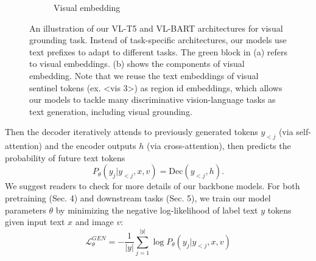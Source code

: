 \documentclass[twocolumn,3p,a4paper,preprint,11pt,margin=2.5cm]{elsarticle}
\begin{document}
\begin{figure}[tp]
\begin{subfigure}{0.45\textwidth}
        \caption{Visual embedding}
        \label{fig:embedding}
    \end{subfigure}
    \caption{An illustration of our VL-T5 and VL-BART architectures for visual grounding task. Instead of task-specific architectures, our
models use text prefixes to adapt to different tasks. The green block in (a) refers to visual embeddings. (b) shows the components of visual
embedding. Note that we reuse the text embeddings of visual sentinel tokens (ex. <vis 3>) as region id embeddings, which allows our
models to tackle many discriminative vision-language tasks as text generation, including visual grounding.}
    \label{fig:combined}
\end{figure}

Then the decoder iteratively attends to previously generated tokens $y_{<j}$ (via self-attention) and the encoder outputs $h$ (via cross-attention), then predicts the probability of future text tokens
$$ P_{\theta}(y_j | y_{<j}, x, v) = \text{Dec}(y_{<j}, h). $$
We suggest readers to check \cite{MingWeiChang} \cite{XinleiChen} for more details of our backbone models. For both pretraining (Sec. 4) and downstream tasks (Sec. 5), we train our model parameters $\theta$ by minimizing the negative log-likelihood of label text $y$ tokens given input text $x$ and image $v$:
\begin{equation}
     \mathcal{L}^{GEN}_{\theta} = - \frac{1}{|y|} \sum_{j=1}^{|y|} \log P_{\theta}(y_j | y_{<j}, x, v) \label{eq:first}
\end{equation}
\end{document}
